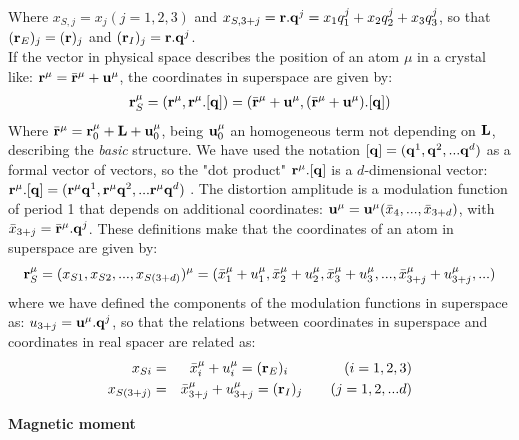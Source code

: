 \documentclass[10pt]{article}
\begin{document}
Where $x_{S,j}=x_j (j=1,2,3)$ and $x_{S,3+j}= {\bf r} . {\bf q}^j = x_1 q_1^j + x_2 q_2^j + x_3 q_3^j $, so that  $ ({\bf r}_E)_j= ({\bf r})_j$ and $ ({\bf r}_I)_j= {\bf r} . {\bf q}^j$.\\

If the vector in physical space describes the position of an atom $\mu$ in a crystal like: $ {\bf r}^\mu =  \bar{\bf r}^\mu + {\bf u}^\mu $, the coordinates in superspace are given by: 
\begin{eqnarray} 
 {\bf r}_S^\mu =  ({\bf r}^\mu, {\bf r}^\mu.[{\bf q}])= (\bar{\bf r}^\mu + {\bf u}^\mu, (\bar{\bf r}^\mu + {\bf u}^\mu).[{\bf q}])
\end{eqnarray}
Where $\bar{\bf r}^\mu={\bf r}_0^\mu + {\bf L}+ {\bf u}_0^\mu$, being ${\bf u}_0^\mu$ an homogeneous term not depending on ${\bf L}$, describing the {\it basic} structure. We have used the notation $[{\bf q}]=({\bf q}^1,{\bf q}^2, ...{\bf q}^d) $ as a formal vector of vectors, so the "dot product" ${\bf r}^\mu.[{\bf q}]$ is a $d$-dimensional vector:  ${\bf r}^\mu.[{\bf q}]= ({\bf r}^\mu{\bf q}^1,{\bf r}^\mu{\bf q}^2, ...{\bf r}^\mu{\bf q}^d) $ . The distortion amplitude is a modulation function of period 1 that depends on additional coordinates: ${\bf u}^\mu={\bf u}^\mu(\bar x_4,...,\bar x_{3+d})$, with $\bar x_{3+j}=\bar{\bf r}^\mu.{\bf q}^j$. These definitions make that the coordinates of an atom in superspace are given by:
\begin{eqnarray} 
{\bf r}_S^\mu = (x_{S1}, x_{S2},...,x_{S(3+d)})^\mu = ({\bar x}_1^\mu+u_1^\mu,{\bar x}_2^\mu+u_2^\mu,{\bar x}_3^\mu+u_3^\mu, ...,  {\bar x}_{3+j}^\mu+u_{3+j}^\mu, ...)
\end{eqnarray}
where we have defined the components of the modulation functions in superspace as: $u_{3+j}={\bf u}^\mu.{\bf q}^j$, so that the relations between coordinates in superspace and coordinates in real spacer are related as:
\begin{eqnarray} 
x_{Si} &=& {\bar x}_i^\mu+u_i^\mu = ({\bf r}_E)_i \qquad \qquad (i=1,2,3)\\ 
x_{S(3+j)} &=&   {\bar x}_{3+j}^\mu+u_{3+j}^\mu =   ({\bf r}_I)_j 
\qquad (j=1,2,...d)\end{eqnarray}


{\bf  Magnetic moment }
\end{document}
